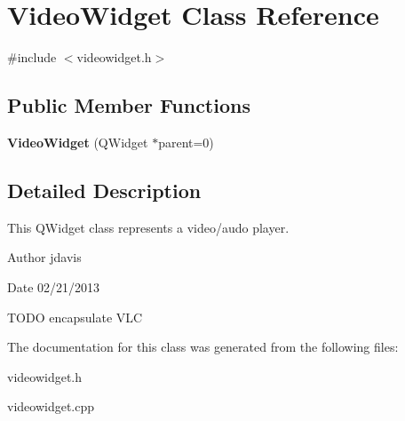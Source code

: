 \hypertarget{classVideoWidget}{\section{Video\-Widget Class Reference}
\label{classVideoWidget}
}


{\ttfamily \#include $<$videowidget.\-h$>$}

\subsection*{Public Member Functions}
\begin{DoxyCompactItemize}
\item 
\hypertarget{classVideoWidget_a31e7897e4abd9733d45753e4a2e25882}{{\bfseries Video\-Widget} (Q\-Widget $\ast$parent=0)}\label{classVideoWidget_a31e7897e4abd9733d45753e4a2e25882}

\end{DoxyCompactItemize}


\subsection{Detailed Description}
This Q\-Widget class represents a video/audo player.

\begin{DoxyAuthor}{Author}
jdavis 
\end{DoxyAuthor}
\begin{DoxyDate}{Date}
02/21/2013
\end{DoxyDate}
T\-O\-D\-O encapsulate V\-L\-C 

The documentation for this class was generated from the following files\-:\begin{DoxyCompactItemize}
\item 
videowidget.\-h\item 
videowidget.\-cpp\end{DoxyCompactItemize}
